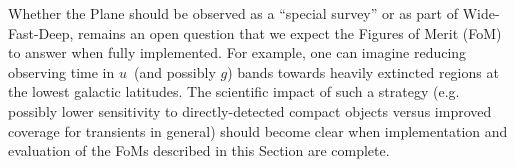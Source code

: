 Whether the Plane should be observed as a ``special survey'' or
  as part of Wide-Fast-Deep, remains an open question that we expect
  the Figures of Merit (FoM) to answer when fully implemented. For
  example, one can imagine reducing observing time in $u$~(and
  possibly $g$) bands towards heavily extincted regions at the lowest
  galactic latitudes. The scientific impact of such a strategy
  (e.g. possibly lower sensitivity to directly-detected compact
  objects versus improved coverage for transients in general) should
  become clear when implementation and evaluation of the FoMs
  described in this Section are complete.




